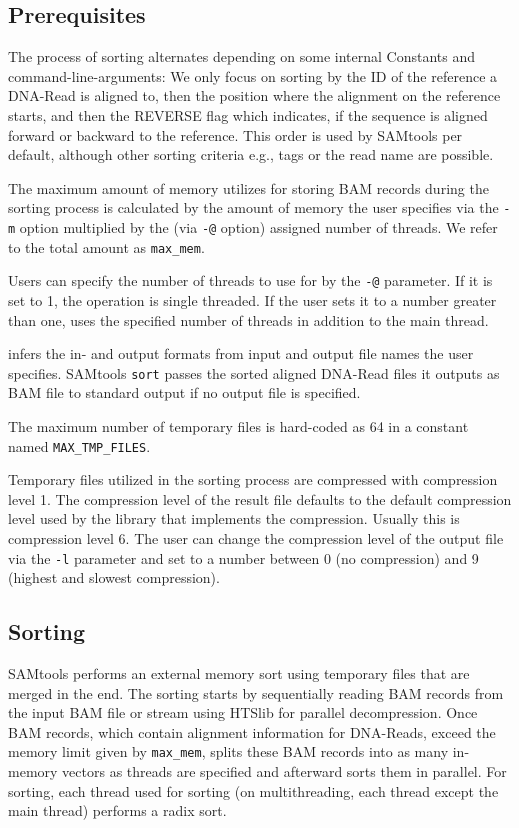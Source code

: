 \subsection{Prerequisites}
The process of sorting alternates depending on some internal Constants and command-line-arguments: 
We only focus on sorting by the ID of the reference a DNA-Read is aligned to, then the position where the alignment on the reference starts, and then the REVERSE flag which indicates, if the sequence is aligned forward or backward to the reference. This order is used by SAMtools per default, although other sorting criteria e.g., tags or the read name are possible.

The maximum amount of memory \sort utilizes for storing BAM records during the sorting process is calculated by the amount of memory the user specifies via the \texttt{-m} option multiplied by the (via \texttt{-@} option) assigned number of threads. We refer to the total amount as \texttt{max\_mem}. 

Users can specify the number of threads to use for \sort by the \texttt{-@} parameter. If it is set to 1, the operation is single threaded. If the user sets it to a number greater than one, \sort uses the specified number of threads in addition to the main thread.

\sort infers the in- and output formats from input and output file names the user specifies. SAMtools \texttt{sort} passes the sorted aligned DNA-Read files it outputs as BAM file to standard output if no output file is specified.

The maximum number of temporary files is hard-coded as 64 in a constant named \texttt{MAX\_TMP\_FILES}. 

Temporary files utilized in the sorting process are compressed with compression level 1. The compression level of the result file defaults to the default compression level used by the library that implements the compression. Usually this is compression level 6. The user can change the compression level of the output file via the \texttt{-l} parameter and set to a number between 0 (no compression) and 9 (highest and slowest compression).

\subsection{Sorting} \label{sorting}

SAMtools performs an external memory sort using temporary files that are merged in the end.
The sorting starts by sequentially reading BAM records from the input BAM file or stream using HTSlib for parallel decompression. Once BAM records, which contain alignment information for DNA-Reads, exceed the memory limit given by \texttt{max\_mem}, \sort splits these BAM records into as many in-memory vectors as threads are specified and afterward sorts them in parallel. For sorting, each thread used for sorting (on multithreading, each thread except the main thread) performs a radix sort.

